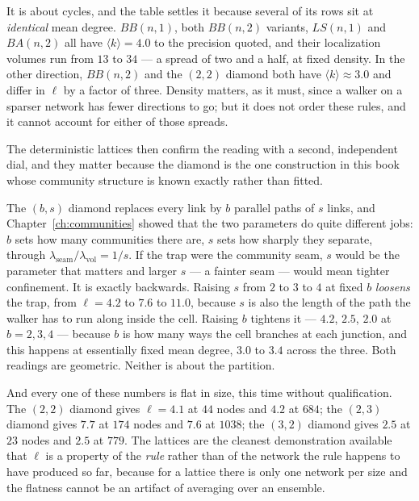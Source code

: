 It is about cycles, and the table settles it because several of its rows sit at
\emph{identical} mean degree. $BB(n,1)$, both $BB(n,2)$ variants, $LS(n,1)$ and
$BA(n,2)$ all have $\langle k\rangle=4.0$ to the precision quoted, and their
localization volumes run from $13$ to $34$ --- a spread of two and a half, at fixed
density. In the other direction, $BB(n,2)$ and the $(2,2)$ diamond both have
$\langle k\rangle\approx3.0$ and differ in $\ell$ by a factor of three. Density
matters, as it must, since a walker on a sparser network has fewer directions to go;
but it does not order these rules, and it cannot account for either of those spreads.

The deterministic lattices then confirm the reading with a second, independent dial,
and they matter because the diamond is the one construction in this book whose
community structure is known exactly rather than fitted.



The $(b,s)$ diamond replaces every link by $b$ parallel paths of $s$ links, and
Chapter~\ref{ch:communities} showed that the two parameters do quite different jobs:
$b$ sets how many communities there are, $s$ sets how sharply they separate, through
$\lambda_{\mathrm{seam}}/\lambda_{\mathrm{vol}}=1/s$. If the trap were the community
seam, $s$ would be the parameter that matters and larger $s$ --- a fainter seam ---
would mean tighter confinement. It is exactly backwards. Raising $s$ from $2$ to $3$
to $4$ at fixed $b$ \emph{loosens} the trap, from $\ell=4.2$ to $7.6$ to $11.0$,
because $s$ is also the length of the path the walker has to run along inside the
cell. Raising $b$ tightens it --- $4.2$, $2.5$, $2.0$ at $b=2,3,4$ --- because $b$ is
how many ways the cell branches at each junction, and this happens at essentially
fixed mean degree, $3.0$ to $3.4$ across the three. Both readings are geometric.
Neither is about the partition.

And every one of these numbers is flat in size, this time without qualification. The
$(2,2)$ diamond gives $\ell=4.1$ at $44$ nodes and $4.2$ at $684$; the $(2,3)$
diamond gives $7.7$ at $174$ nodes and $7.6$ at $1038$; the $(3,2)$ diamond gives
$2.5$ at $23$ nodes and $2.5$ at $779$. The lattices are the cleanest demonstration
available that $\ell$ is a property of the \emph{rule} rather than of the network the
rule happens to have produced so far, because for a lattice there is only one network
per size and the flatness cannot be an artifact of averaging over an ensemble.

